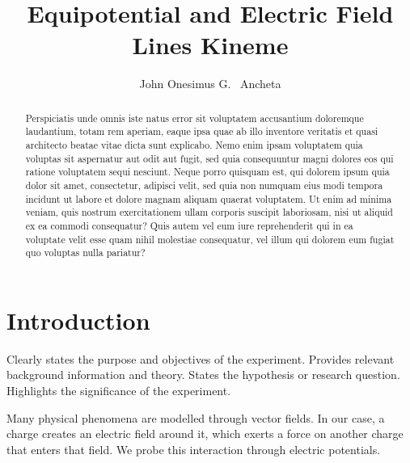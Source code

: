 \documentclass[10pt,a4paper,twoside]{article}
\begin{document}
\title{\TitleFont Equipotential and Electric Field Lines Kineme}



\author[*\negthickspace]{John Onesimus G. ~Ancheta}

\begin{abstract}
\noindent
Perspiciatis unde omnis iste natus error sit voluptatem accusantium doloremque laudantium, totam rem aperiam, eaque ipsa quae ab illo inventore veritatis et quasi architecto beatae vitae dicta sunt explicabo. Nemo enim ipsam voluptatem quia voluptas sit aspernatur aut odit aut fugit, sed quia consequuntur magni dolores eos qui ratione voluptatem sequi nesciunt. Neque porro quisquam est, qui dolorem ipsum quia dolor sit amet, consectetur, adipisci velit, sed quia non numquam eius modi tempora incidunt ut labore et dolore magnam aliquam quaerat voluptatem. Ut enim ad minima veniam, quis nostrum exercitationem ullam corporis suscipit laboriosam, nisi ut aliquid ex ea commodi consequatur? Quis autem vel eum iure reprehenderit qui in ea voluptate velit esse quam nihil molestiae consequatur, vel illum qui dolorem eum fugiat quo voluptas nulla pariatur?


\end{abstract}

\maketitle
\thispagestyle{titlestyle}


\section{Introduction}\label{sec:intro}

Clearly states the purpose and objectives of the experiment.
Provides relevant background information and theory.
States the hypothesis or research question.
Highlights the significance of the experiment.

Many physical phenomena are modelled through vector fields. In our case, a charge creates an electric field around it, which exerts a force on another charge that enters that field. We probe this interaction
through electric potentials.
\end{document}
